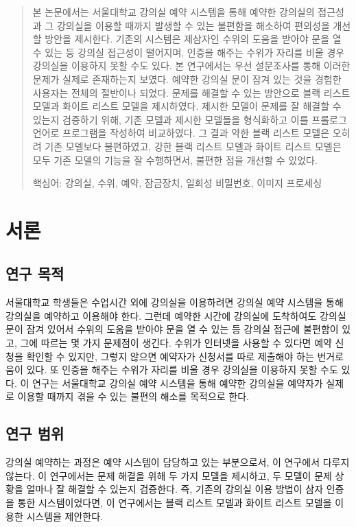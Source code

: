 \documentclass[11pt,a4paper]{article}
\begin{document}
\thispagestyle{empty}
\pagebreak
{}
\setcounter{page}{1}
\renewcommand{\abstractname}{초록}
\begin{abstract}
본 논문에서는 서울대학교 강의실 예약 시스템을 통해 예약한 강의실의 접근성과 그
강의실을 이용할 때까지 발생할 수 있는 불편함을 해소하여 편의성을 개선할 방안을
제시한다. 기존의 시스템은 제삼자인 수위의 도움을 받아야 문을 열 수 있는 등
강의실 접근성이 떨어지며, 인증을 해주는 수위가 자리를 비울 경우 강의실을
이용하지 못할 수도 있다. 본 연구에서는 우선 설문조사를 통해 이러한 문제가
실제로 존재하는지 보였다. 예약한 강의실 문이 잠겨 있는 것을 경험한 사용자는
전체의 절반이나 되었다. 문제를 해결할 수 있는 방안으로 블랙 리스트 모델과
화이트 리스트 모델을 제시하였다. 제시한 모델이 문제를 잘 해결할 수 있는지
검증하기 위해, 기존 모델과 제시한 모델들을 형식화하고 이를 프롤로그 언어로
프로그램을 작성하여 비교하였다. 그 결과 약한 블랙 리스트 모델은 오히려 기존
모델보다 불편하였고, 강한 블랙 리스트 모델과 화이트 리스트 모델은 모두 기존
모델의 기능을 잘 수행하면서, 불편한 점을 개선할 수 있었다.\\
\centerline{핵심어: 강의실, 수위, 예약, 잠금장치, 일회성 비밀번호, 이미지 프로세싱}
\end{abstract}
\pagebreak

\renewcommand{\contentsname}{목차}
\tableofcontents

\pagebreak
{}
\setcounter{page}{1}
\section{서론}

\subsection{연구 목적}
서울대학교 학생들은 수업시간 외에 강의실을 이용하려면 강의실 예약 시스템을 통해
강의실을 예약하고 이용해야 한다. 그런데 예약한 시간에 강의실에 도착하여도
강의실 문이 잠겨 있어서 수위의 도움을 받아야 문을 열 수 있는 등 강의실 접근에
불편함이 있고, 그에 따르는 몇 가지 문제점이 생긴다. 수위가 인터넷을 사용할 수
있다면 예약 신청을 확인할 수 있지만, 그렇지 않으면 예약자가 신청서를 따로
제출해야 하는 번거로움이 있다. 또 인증을 해주는 수위가 자리를 비울 경우
강의실을 이용하지 못할 수도 있다. 이 연구는 서울대학교 강의실 예약 시스템을
통해 예약한 강의실을 예약자가 실제로 이용할 때까지 겪을 수 있는 불편의 해소를
목적으로 한다.

\subsection{연구 범위}
강의실 예약하는 과정은 예약 시스템이 담당하고 있는 부분으로서, 이 연구에서
다루지 않는다. 이 연구에서는 문제 해결을 위해 두 가지 모델을 제시하고, 두
모델이 문제 상황을 얼마나 잘 해결할 수 있는지 검증한다. 즉, 기존의 강의실 이용
방법이 삼자 인증을 통한 시스템이었다면, 이 연구에서는 블랙 리스트 모델과 화이트
리스트 모델을 이용한 시스템을 제안한다.
\end{document}
